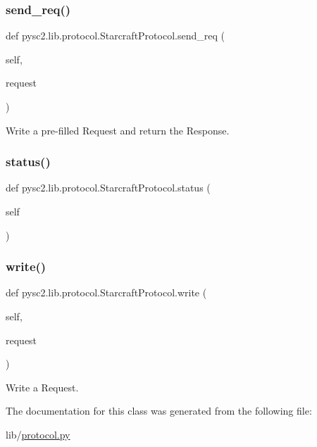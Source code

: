 \subsubsection{\texorpdfstring{send\+\_\+req()}{send\_req()}}
{\footnotesize\ttfamily def pysc2.\+lib.\+protocol.\+Starcraft\+Protocol.\+send\+\_\+req (\begin{DoxyParamCaption}\item[{}]{self,  }\item[{}]{request }\end{DoxyParamCaption})}

\begin{DoxyVerb}Write a pre-filled Request and return the Response.\end{DoxyVerb}
 \mbox{\label{classpysc2_1_1lib_1_1protocol_1_1_starcraft_protocol_a0dce2570a5feaa1da6e3d282fc2ea83a}} 
\subsubsection{\texorpdfstring{status()}{status()}}
{\footnotesize\ttfamily def pysc2.\+lib.\+protocol.\+Starcraft\+Protocol.\+status (\begin{DoxyParamCaption}\item[{}]{self }\end{DoxyParamCaption})}

\mbox{\label{classpysc2_1_1lib_1_1protocol_1_1_starcraft_protocol_a03ee4d6020768e77fd68d290ffa423a5}} 
\subsubsection{\texorpdfstring{write()}{write()}}
{\footnotesize\ttfamily def pysc2.\+lib.\+protocol.\+Starcraft\+Protocol.\+write (\begin{DoxyParamCaption}\item[{}]{self,  }\item[{}]{request }\end{DoxyParamCaption})}

\begin{DoxyVerb}Write a Request.\end{DoxyVerb}
 

The documentation for this class was generated from the following file\+:\begin{DoxyCompactItemize}
\item 
lib/\mbox{\hyperlink{protocol_8py}{protocol.\+py}}\end{DoxyCompactItemize}
